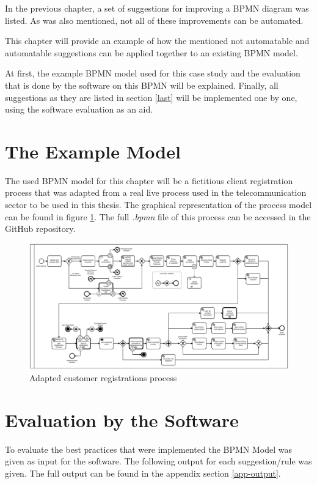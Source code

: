 \label{chapter-5}
In the previous chapter, a set of suggestions for improving a BPMN diagram was listed. As was also mentioned, not all of these improvements can be automated. 

This chapter will provide an example of how the mentioned not automatable and automatable suggestions can be applied together to an existing BPMN model. 

At first, the example BPMN model used for this case study and the evaluation that is done by the software on this BPMN will be explained. Finally, all suggestions as they are listed in section \ref{last} will be implemented one by one, using the software evaluation as an aid. 

\section{The Example Model}
The used BPMN model for this chapter will be a fictitious client registration process that was adapted from a real live process used in the telecommunication sector to be used in this thesis. The graphical representation of the process model can be found in figure \ref{fig:example-process}. The full \textit{.bpmn} file of this process can be accessed in the GitHub repository\cite{appendix-registration-1}. 

\begin{figure}[H]
	\centering
	\includegraphics[width=1.7\columnwidth, angle=90]{graphics/register-customer/1-registercustomer-bpmn.pdf}
	\caption{Adapted customer registrations process} 
	\label{fig:example-process} 
\end{figure}

\section{Evaluation by the Software}
To evaluate the best practices that were implemented the BPMN Model was given as input for the software. The following output for each suggestion/rule was given. The full output can be found in the appendix section \ref{app-output}.
